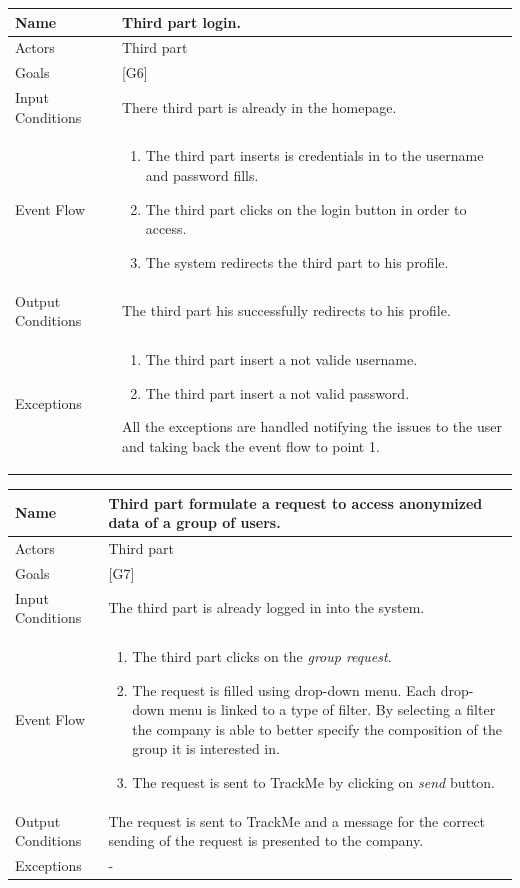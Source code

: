\documentclass{article}
\begin{document}
\begin{center}
    \begin{tabular}{ | l | p{10cm} |}
    \hline
    Name & Third part login.\\ \hline
    Actors & Third part\\ \hline
   	Goals & {[G6]}\\ \hline
    Input Conditions & There third part is already in the homepage.\\ \hline
    Event Flow & \begin{enumerate}
    	\item The third part inserts is credentials in to the username and password fills.
		\item The third part clicks on the login button in order to access.
		\item The system redirects the third part to his profile.
    \end{enumerate} \\ \hline
    Output Conditions & The third part his successfully redirects to his profile.  \\ \hline
    Exceptions & \begin{enumerate}
   \item The third part insert a not valide username.
	\item The third part insert a not valid password.
\end{enumerate} All the exceptions are handled notifying the issues to the user and taking back the event flow to point 1.    \\ \hline
    \end{tabular}
\end{center}

\begin{center}
    \begin{tabular}{ | l | p{10cm} |}
    \hline
    Name & Third part formulate a request to access anonymized data of a group of users.\\ \hline
    Actors & Third part\\ \hline
   	Goals & {[G7]}\\ \hline
    Input Conditions & The third part is already logged in into the system.\\ \hline
    Event Flow & \begin{enumerate}
    	\item The third part clicks on the \emph{group request}.
    	\item The request is filled using drop-down menu. Each drop-down menu is linked to a type of filter. By selecting a filter the company is able to better specify the composition of the group it is interested in.
		\item The request is sent to TrackMe by clicking on \emph{send} button. 
    \end{enumerate} \\ \hline
    Output Conditions & The request is sent to TrackMe and a message for the correct sending of the request is presented to the company. \\ \hline
    Exceptions & -   \\ \hline
    \end{tabular}
\end{center}
\end{document}
